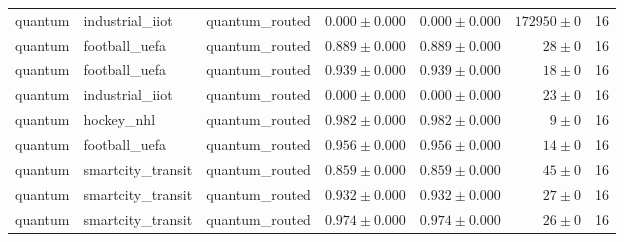 \begin{table}[htbp]
\begin{tabular}{l l l r r r r}
quantum & industrial\_iiot & quantum\_routed & $0.000\pm0.000$ & $0.000\pm0.000$ & $172950\pm0$ & 16 \\
quantum & football\_uefa & quantum\_routed & $0.889\pm0.000$ & $0.889\pm0.000$ & $28\pm0$ & 16 \\
quantum & football\_uefa & quantum\_routed & $0.939\pm0.000$ & $0.939\pm0.000$ & $18\pm0$ & 16 \\
quantum & industrial\_iiot & quantum\_routed & $0.000\pm0.000$ & $0.000\pm0.000$ & $23\pm0$ & 16 \\
quantum & hockey\_nhl & quantum\_routed & $0.982\pm0.000$ & $0.982\pm0.000$ & $9\pm0$ & 16 \\
quantum & football\_uefa & quantum\_routed & $0.956\pm0.000$ & $0.956\pm0.000$ & $14\pm0$ & 16 \\
quantum & smartcity\_transit & quantum\_routed & $0.859\pm0.000$ & $0.859\pm0.000$ & $45\pm0$ & 16 \\
quantum & smartcity\_transit & quantum\_routed & $0.932\pm0.000$ & $0.932\pm0.000$ & $27\pm0$ & 16 \\
quantum & smartcity\_transit & quantum\_routed & $0.974\pm0.000$ & $0.974\pm0.000$ & $26\pm0$ & 16 \\
\hline
\end{tabular}
\end{table}
